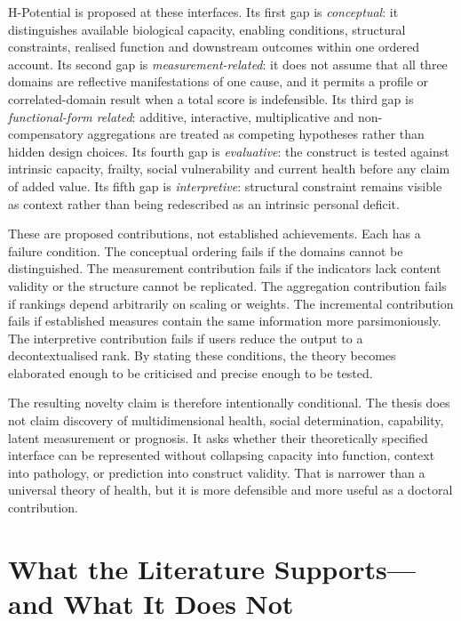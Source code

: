 H-Potential is proposed at these interfaces. Its first gap is
\emph{conceptual}: it distinguishes available biological capacity, enabling
conditions, structural constraints, realised function and downstream outcomes
within one ordered account. Its second gap is \emph{measurement-related}: it
does not assume that all three domains are reflective manifestations of one
cause, and it permits a profile or correlated-domain result when a total score
is indefensible. Its third gap is \emph{functional-form related}: additive,
interactive, multiplicative and non-compensatory aggregations are treated as
competing hypotheses rather than hidden design choices. Its fourth gap is
\emph{evaluative}: the construct is tested against intrinsic capacity, frailty,
social vulnerability and current health before any claim of added value. Its
fifth gap is \emph{interpretive}: structural constraint remains visible as
context rather than being redescribed as an intrinsic personal deficit.

These are proposed contributions, not established achievements. Each has a
failure condition. The conceptual ordering fails if the domains cannot be
distinguished. The measurement contribution fails if the indicators lack
content validity or the structure cannot be replicated. The aggregation
contribution fails if rankings depend arbitrarily on scaling or weights. The
incremental contribution fails if established measures contain the same
information more parsimoniously. The interpretive contribution fails if users
reduce the output to a decontextualised rank. By stating these conditions, the
theory becomes elaborated enough to be criticised and precise enough to be
tested.

The resulting novelty claim is therefore intentionally conditional. The thesis
does not claim discovery of multidimensional health, social determination,
capability, latent measurement or prognosis. It asks whether their theoretically
specified interface can be represented without collapsing capacity into
function, context into pathology, or prediction into construct validity. That
is narrower than a universal theory of health, but it is more defensible and
more useful as a doctoral contribution.

\section{What the Literature Supports---and What It Does Not}

